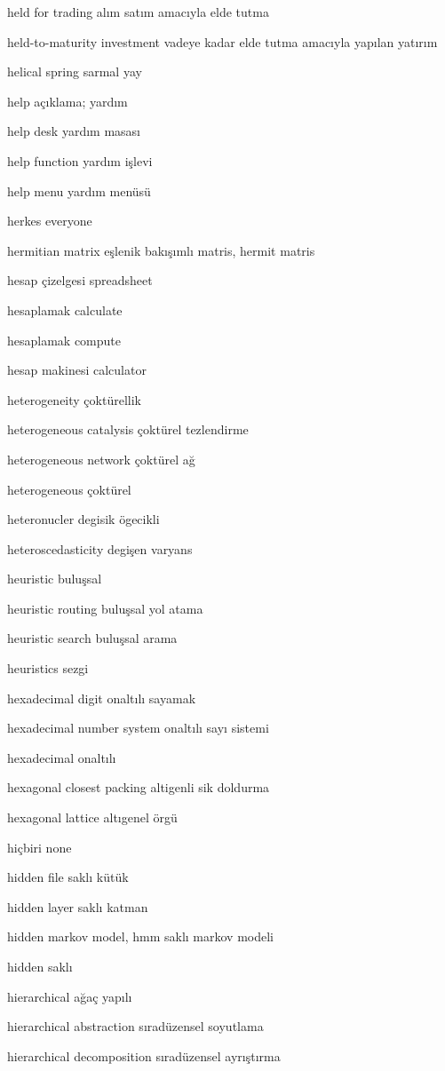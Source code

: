 \documentclass[12pt,fleqn]{article}\usepackage{../../common}
\begin{document}
held for trading alım satım amacıyla elde tutma

held-to-maturity investment vadeye kadar elde tutma amacıyla yapılan yatırım

helical spring sarmal yay

help açıklama; yardım

help desk yardım masası

help function yardım işlevi

help menu yardım menüsü

herkes everyone

hermitian matrix eşlenik bakışımlı matris, hermit matris

hesap çizelgesi spreadsheet

hesaplamak calculate

hesaplamak compute

hesap makinesi calculator

heterogeneity çoktürellik

heterogeneous catalysis çoktürel tezlendirme

heterogeneous network çoktürel ağ

heterogeneous çoktürel

heteronucler degisik ögecikli

heteroscedasticity degişen varyans

heuristic buluşsal

heuristic routing buluşsal yol atama

heuristic search buluşsal arama

heuristics sezgi

hexadecimal digit onaltılı sayamak

hexadecimal number system onaltılı sayı sistemi

hexadecimal onaltılı

hexagonal closest packing altigenli sik doldurma

hexagonal lattice altıgenel örgü

hiçbiri none

hidden file saklı kütük

hidden layer saklı katman

hidden markov model, hmm saklı markov modeli

hidden saklı

hierarchical ağaç yapılı

hierarchical abstraction sıradüzensel soyutlama

hierarchical decomposition sıradüzensel ayrıştırma
\end{document}

